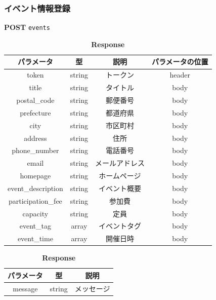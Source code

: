 \subsubsection*{イベント情報登録}
\textbf{POST} \texttt{events}
\begin{table}[H]
  \begin{minipage}
    {0.5\hsize} \centering
    \captionsetup{labelformat=empty,labelsep=none} \caption{\textbf{Request}}
    \small
    \begin{tabular}{|c|c|c|c|} \hline
      パラメータ              & 型      & 説明      & パラメータの位置 \\ \hline \hline
      token              & string & トークン    & header   \\ \hline
      title              & string & タイトル    & body     \\ \hline
      postal\_code       & string & 郵便番号    & body     \\ \hline
      prefecture         & string & 都道府県    & body     \\ \hline
      city               & string & 市区町村    & body     \\ \hline
      address            & string & 住所      & body     \\ \hline
      phone\_number      & string & 電話番号    & body     \\ \hline
      email              & string & メールアドレス & body     \\ \hline
      homepage           & string & ホームページ  & body     \\ \hline
      event\_description & string & イベント概要  & body     \\ \hline
      participation\_fee & string & 参加費     & body     \\ \hline
      capacity           & string & 定員      & body     \\ \hline
      event\_tag         & array  & イベントタグ  & body     \\ \hline
      event\_time        & array  & 開催日時    & body     \\ \hline
    \end{tabular}
  \end{minipage}
  \begin{minipage}
    {0.5\hsize} \centering \captionsetup{labelformat=empty,labelsep=none}
    \caption{\textbf{Response}}
    \begin{tabular}{|c|c|c|} \hline
      パラメータ   & 型      & 説明    \\ \hline \hline
      message & string & メッセージ \\ \hline
    \end{tabular}
  \end{minipage}
\end{table}

